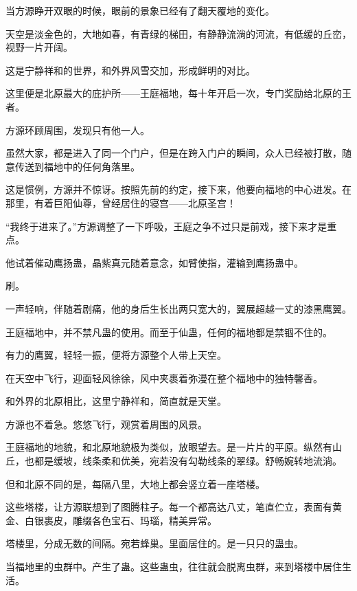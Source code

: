 
\begin{this_body}



当方源睁开双眼的时候，眼前的景象已经有了翻天覆地的变化。

天空是淡金色的，大地如春，有青绿的梯田，有静静流淌的河流，有低缓的丘峦，视野一片开阔。

这是宁静祥和的世界，和外界风雪交加，形成鲜明的对比。

这里便是北原最大的庇护所——王庭福地，每十年开启一次，专门奖励给北原的王者。

方源环顾周围，发现只有他一人。

虽然大家，都是进入了同一个门户，但是在跨入门户的瞬间，众人已经被打散，随意传送到福地中的任何角落里。

这是惯例，方源并不惊讶。按照先前的约定，接下来，他要向福地的中心进发。在那里，有着巨阳仙尊，曾经居住的寝宫——北原圣宫！

“我终于进来了。”方源调整了一下呼吸，王庭之争不过只是前戏，接下来才是重点。

他试着催动鹰扬蛊，晶紫真元随着意念，如臂使指，灌输到鹰扬蛊中。

刷。

一声轻响，伴随着剧痛，他的身后生长出两只宽大的，翼展超越一丈的漆黑鹰翼。

王庭福地中，并不禁凡蛊的使用。而至于仙蛊，任何的福地都是禁锢不住的。

有力的鹰翼，轻轻一振，便将方源整个人带上天空。

在天空中飞行，迎面轻风徐徐，风中夹裹着弥漫在整个福地中的独特馨香。

和外界的北原相比，这里宁静祥和，简直就是天堂。

方源也不着急。悠悠飞行，观赏着周围的风景。

王庭福地的地貌，和北原地貌极为类似，放眼望去。是一片片的平原。纵然有山丘，也都是缓坡，线条柔和优美，宛若没有勾勒线条的翠绿。舒畅婉转地流淌。

但和北原不同的是，每隔八里，大地上都会竖立着一座塔楼。

这些塔楼，让方源联想到了图腾柱子。每一个都高达八丈，笔直伫立，表面有黄金、白银裹皮，雕缀各色宝石、玛瑙，精美异常。

塔楼里，分成无数的间隔。宛若蜂巢。里面居住的。是一只只的蛊虫。

当福地里的虫群中。产生了蛊。这些蛊虫，往往就会脱离虫群，来到塔楼中居住生活。


\end{this_body}
